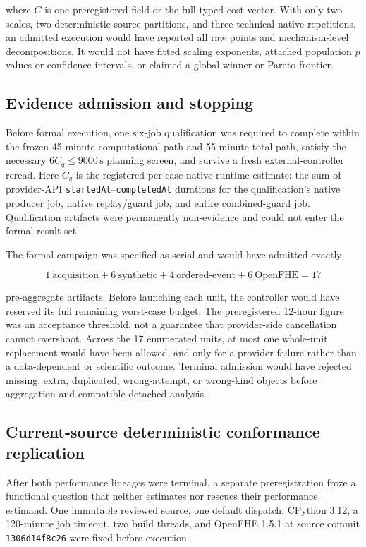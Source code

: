 where \(C\) is one preregistered field or the full typed cost vector. With only two scales, two deterministic source partitions, and three technical native repetitions, an admitted execution would have reported all raw points and mechanism-level decompositions. It would not have fitted scaling exponents, attached population \(p\) values or confidence intervals, or claimed a global winner or Pareto frontier.

\subsection{Evidence admission and stopping}\label{evidence-admission-and-stopping}

Before formal execution, one six-job qualification was required to complete within the frozen 45-minute computational path and 55-minute total path, satisfy the necessary \(6C_q\leq9000\,\mathrm{s}\) planning screen, and survive a fresh external-controller reread. Here \(C_q\) is the registered per-case native-runtime estimate: the sum of provider-API \texttt{startedAt}--\texttt{completedAt} durations for the qualification's native producer job, native replay/guard job, and entire combined-guard job. Qualification artifacts were permanently non-evidence and could not enter the formal result set.

The formal campaign was specified as serial and would have admitted exactly

\[
1\ \text{acquisition}
+6\ \text{synthetic}
+4\ \text{ordered-event}
+6\ \text{OpenFHE}
=17
\]

pre-aggregate artifacts. Before launching each unit, the controller would have reserved its full remaining worst-case budget. The preregistered 12-hour figure was an acceptance threshold, not a guarantee that provider-side cancellation cannot overshoot. Across the 17 enumerated units, at most one whole-unit replacement would have been allowed, and only for a provider failure rather than a data-dependent or scientific outcome. Terminal admission would have rejected missing, extra, duplicated, wrong-attempt, or wrong-kind objects before aggregation and compatible detached analysis.

\subsection{Current-source deterministic conformance replication}\label{current-source-deterministic-conformance-replication}

After both performance lineages were terminal, a separate preregistration froze
a functional question that neither estimates nor rescues their performance
estimand. One immutable reviewed source, one default dispatch, CPython 3.12, a
120-minute job timeout, two build threads, and OpenFHE 1.5.1 at source commit
\texttt{1306d14f8c26} were fixed before execution.

